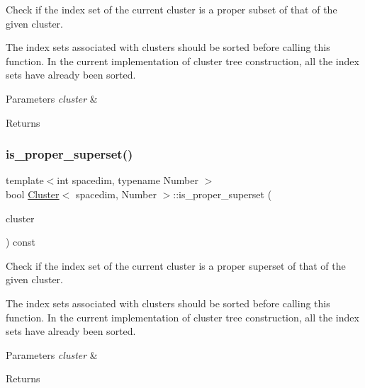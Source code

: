 Check if the index set of the current cluster is a proper subset of that of the given cluster.


\begin{DoxyDescription}
\item[Note ]The index sets associated with clusters should be sorted before calling this function. In the current implementation of cluster tree construction, all the index sets have already been sorted. 
\end{DoxyDescription}
\begin{DoxyParams}{Parameters}
{\em cluster} & \\
\hline
\end{DoxyParams}
\begin{DoxyReturn}{Returns}

\end{DoxyReturn}
\mbox{\label{classCluster_adfabc1eae12e962bae4af0a1854c3795}} 
\subsubsection{\texorpdfstring{is\+\_\+proper\+\_\+superset()}{is\_proper\_superset()}}
{\footnotesize\ttfamily template$<$int spacedim, typename Number $>$ \\
bool \hyperlink{classCluster}{Cluster}$<$ spacedim, Number $>$\+::is\+\_\+proper\+\_\+superset (\begin{DoxyParamCaption}\item[{const \hyperlink{classCluster}{Cluster}$<$ spacedim, Number $>$ \&}]{cluster }\end{DoxyParamCaption}) const}

Check if the index set of the current cluster is a proper superset of that of the given cluster.


\begin{DoxyDescription}
\item[Note ]The index sets associated with clusters should be sorted before calling this function. In the current implementation of cluster tree construction, all the index sets have already been sorted. 
\end{DoxyDescription}
\begin{DoxyParams}{Parameters}
{\em cluster} & \\
\hline
\end{DoxyParams}
\begin{DoxyReturn}{Returns}

\end{DoxyReturn}
\mbox{\label{classCluster_a8cbdd8366b60c14f44a951ebfe024bb5}} 
